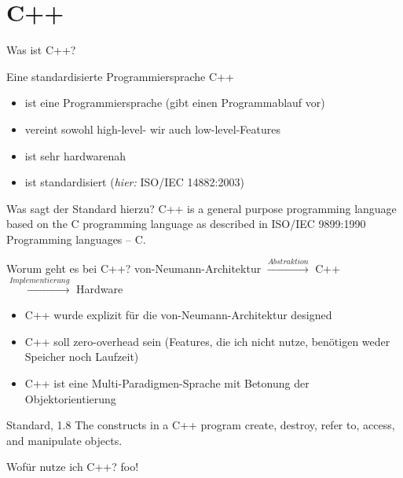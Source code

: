 \section{C++}


\begin{frame}{Was ist C++?}
	\begin{block}{Eine standardisierte Programmiersprache}
		C++
		\begin{itemize}
			\item ist eine Programmiersprache (gibt einen Programmablauf vor)
			\item vereint sowohl high-level- wir auch low-level-Features
			\item ist sehr hardwarenah
			\item ist standardisiert (\emph{hier:} ISO/IEC 14882:2003)
		\end{itemize}
	\end{block}
	
	\pause
	
	\begin{block}{Was sagt der Standard hierzu?}
		C++ is a general purpose programming language based on the C programming language as described in
		ISO/IEC 9899:1990 Programming languages – C.
	\end{block}
\end{frame}

\begin{frame}{Worum geht es bei C++?}
	von-Neumann-Architektur $\xrightarrow{Abstraktion}$ C++ $\xrightarrow{Implementierung}$ Hardware
	
	\begin{itemize}
		\item C++ wurde explizit für die von-Neumann-Architektur designed
		\item C++ soll zero-overhead sein (Features, die ich nicht nutze, benötigen weder Speicher noch Laufzeit)
		\item C++ ist eine Multi-Paradigmen-Sprache mit Betonung der Objektorientierung
	\end{itemize}
	
	\begin{block}{Standard, 1.8}
		The constructs in a C++ program create, destroy, refer to, access, and manipulate objects.
	\end{block}
\end{frame}

\begin{frame}{Wofür nutze ich C++?}
	foo!
\end{frame}

